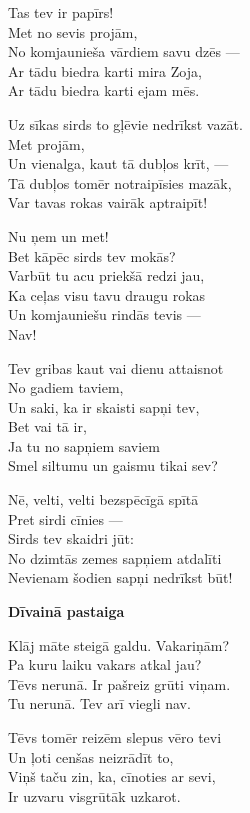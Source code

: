 \documentclass[14pt]{extarticle}
\begin{document}
{{Tas tev ir papīrs!\\
Met no sevis projām,\\
No komjaunieša vārdiem savu dzēs ---\\
Ar tādu biedra karti mira Zoja,\\
Ar tādu biedra karti ejam mēs. 

Uz sīkas sirds to gļēvie nedrīkst vazāt.\\
Met projām,\\
Un vienalga, kaut tā dubļos krīt, ---\\
Tā dubļos tomēr notraipīsies mazāk,\\
Var tavas rokas vairāk aptraipīt!

Nu ņem un met!\\
Bet kāpēc sirds tev mokās?\\
Varbūt tu acu priekšā redzi jau,\\
Ka ceļas visu tavu draugu rokas\\
Un komjauniešu rindās tevis ---\\
Nav!

Tev gribas kaut vai dienu attaisnot\\
No gadiem taviem,\\
Un saki, ka ir skaisti sapņi tev,\\
Bet vai tā ir,\\
Ja tu no sapņiem saviem\\
Smel siltumu un gaismu tikai sev?

Nē, velti, velti bezspēcīgā spītā\\
Pret sirdi cīnies ---\\
Sirds tev skaidri jūt:\\
No dzimtās zemes sapņiem atdalīti\\
Nevienam šodien sapņi nedrīkst būt!


\newpage

{\bf Dīvainā pastaiga}

Klāj māte steigā galdu. Vakariņām?\\
Pa kuru laiku vakars atkal jau?\\
Tēvs nerunā. Ir pašreiz grūti viņam.\\
Tu nerunā. Tev arī viegli nav. 

Tēvs tomēr reizēm slepus vēro tevi\\
Un ļoti cenšas neizrādīt to,\\
Viņš taču zin, ka, cīnoties ar sevi,\\
Ir uzvaru visgrūtāk uzkarot. 

}}
\end{document}
